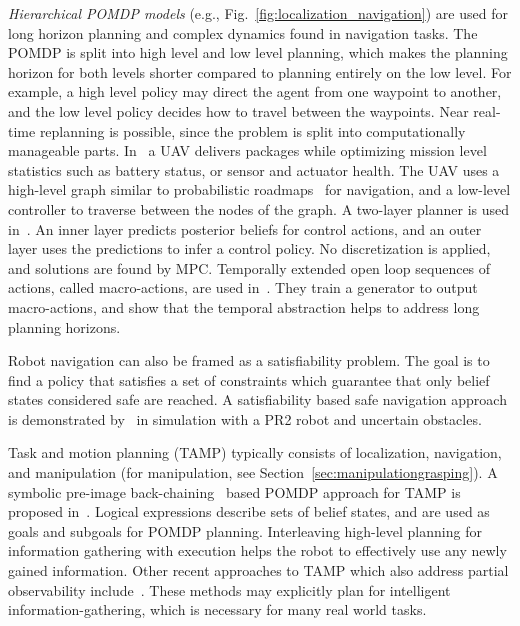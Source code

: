 \documentclass[journal]{IEEEtran}
\begin{document}
{\emph{Hierarchical POMDP models} (e.g., Fig.~\ref{fig:localization_navigation}) are} used for long horizon
planning and complex dynamics found in navigation tasks.
{The POMDP
is split into high level and low level planning, which makes the planning horizon
for both levels shorter} compared to planning
entirely on the low level. For example, a high level policy {may} direct
the agent from one waypoint to another, and the low level policy
decides how to travel between the waypoints. {Near real-time replanning is possible, since the problem is split into computationally manageable
parts.}
In~\cite{agha2014health} a UAV {delivers} packages while optimizing
mission level statistics such as battery status, or sensor and
actuator health.
{The UAV uses a high-level graph similar to probabilistic roadmaps~\cite{kavraki1996probabilistic} for navigation, and a low-level controller to traverse between the nodes of the graph.}
{A two-layer planner is used in~\cite{indelman2015planning}.
An inner layer predicts posterior beliefs for control actions, and an outer layer uses the predictions to infer a control policy.
No discretization is applied, and solutions are found by MPC.
}
{Temporally extended open loop sequences of actions, called macro-actions, are used in~\cite{lee2021}.
They train a generator to output macro-actions, and show that the temporal abstraction helps to address long planning horizons.
}

Robot navigation can also be framed as a
satisfiability problem.
The goal is to find a policy that satisfies a set of constraints which guarantee that only belief states considered safe are reached.
A satisfiability
based safe navigation approach is demonstrated by~\cite{wang2018bounded} in simulation with a PR2 robot and
uncertain obstacles.

{Task and motion planning (TAMP) typically} consists of
localization, navigation, and manipulation (for manipulation, see
Section~\ref{sec:manipulationgrasping}).
{A symbolic pre-image back-chaining~\cite{kaelbling2017pre} based POMDP approach for TAMP is proposed in~\cite{kaelbling2013integrated}.}
Logical expressions describe sets of belief states, and are used
as goals and subgoals for POMDP planning.
{Interleaving high-level planning for information gathering with execution helps the robot to effectively use any newly gained information.}
{Other recent approaches to TAMP which also address partial observability include~\cite{phiquepal2019,garrett2020}.
These methods may explicitly plan for intelligent information-gathering, which is necessary for many real world tasks.
%
}
\end{document}
